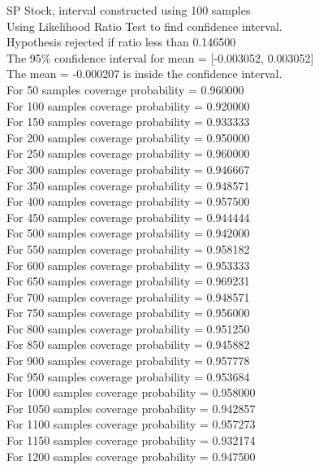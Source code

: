 \documentclass{article}
\begin{document}
SP Stock, interval constructed using 100 samples\\
Using Likelihood Ratio Test to find confidence interval.\\
Hypothesis rejected if ratio less than 0.146500\\
The 95\% confidence interval for mean = [-0.003052, 0.003052]\\
The mean = -0.000207 is inside the confidence interval.\\
For 50 samples coverage probability = 0.960000\\
For 100 samples coverage probability = 0.920000\\
For 150 samples coverage probability = 0.933333\\
For 200 samples coverage probability = 0.950000\\
For 250 samples coverage probability = 0.960000\\
For 300 samples coverage probability = 0.946667\\
For 350 samples coverage probability = 0.948571\\
For 400 samples coverage probability = 0.957500\\
For 450 samples coverage probability = 0.944444\\
For 500 samples coverage probability = 0.942000\\
For 550 samples coverage probability = 0.958182\\
For 600 samples coverage probability = 0.953333\\
For 650 samples coverage probability = 0.969231\\
For 700 samples coverage probability = 0.948571\\
For 750 samples coverage probability = 0.956000\\
For 800 samples coverage probability = 0.951250\\
For 850 samples coverage probability = 0.945882\\
For 900 samples coverage probability = 0.957778\\
For 950 samples coverage probability = 0.953684\\
For 1000 samples coverage probability = 0.958000\\
For 1050 samples coverage probability = 0.942857\\
For 1100 samples coverage probability = 0.957273\\
For 1150 samples coverage probability = 0.932174\\
For 1200 samples coverage probability = 0.947500\\
\end{document}
